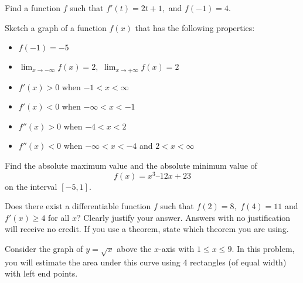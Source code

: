 \documentclass[addpoints,12pt]{exam}
\begin{document}
\begin{questions}

\newpage

\question[5] Find a function $f$ such that $f'(t) = 2t+1,$ and $f(-1) = 4.$

\newpage

\question[7] Sketch a graph of a function $f(x)$ that has the following properties:

\begin{itemize}
\item $f(-1)=-5$
\item $\displaystyle\lim_{x\to -\infty} f(x) = 2,$ $\displaystyle\lim_{x\to +\infty}f(x) = 2$
\item $f'(x)>0$ when $-1<x<\infty$

\item $f'(x)<0$ when $-\infty<x<-1$
\item $f''(x)>0$ when $-4<x<2$
\item $f''(x)<0$ when $-\infty<x<-4$ and $2<x<\infty$

\end{itemize}


\begin{center}

\end{center}

\newpage

\question[7] Find the absolute maximum value and the absolute minimum value of $$f(x) = x^3 –
12x + 23$$ on the interval $[-5, 1].$

\newpage

\question[5] Does there exist a differentiable function $f$ such that $f(2) = 8,$ $ f(4) = 11$ and
$f'(x) \ge 4$ for all $x$? Clearly justify your answer. Answers with no justification will receive no
credit. If you use a theorem, state which theorem
you are using.

\newpage


\question Consider the graph of $y = \sqrt{x}$ above the $x$-axis with $1 \le x\le 9$. In this
problem, you will estimate the area under this curve using 4 rectangles (of equal width) with left
end points.

\begin{parts}

\end{parts}
\end{questions}
\end{document}
